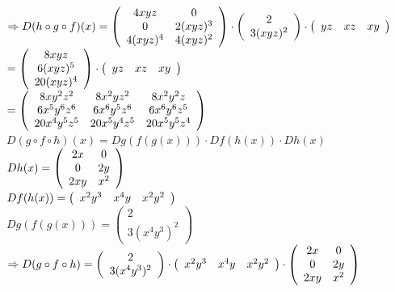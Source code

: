 \documentclass[a4paper]{article}
\begin{document}
$ \Rightarrow D(h \circ g \circ f)(x) = \left(\begin{array}{c c} 4xyz & 0 \\ 0 & 2(xyz)^3 \\ 4(xyz)^4 & 4(xyz)^2 \end{array} \right)
 \cdot \left(\begin{array}{c} 2 \\ 3(xyz)^2 \end{array}\right) \cdot  \left(\begin{array}{c c c} yz & xz & xy \end{array}\right) $\\

$ = \left(\begin{array}{c} 8xyz \\ 6(xyz)^5 \\ 20(xyz)^4 \end{array}\right) \cdot \left(\begin{array}{c c c} yz & xz & xy \end{array}\right) $\\

$ = \left(\begin{array}{c c c} 8xy^2z^2 & 8x^2yz^2 & 8x^2y^2z \\ 6x^5y^6z^6 & 6x^6y^5z^6 & 6 x^6y^6z^5 
\\ 20x^4y^5z^5 & 20 x^5y^4z^5 & 20x^5y^5z^4 \end{array}\right) $\\

$ D(g \circ f \circ h)(x) = Dg(f(g(x))) \cdot Df(h(x)) \cdot Dh(x) $\\

$ Dh(x) =  \left(\begin{array}{c c} 2x & 0 \\ 0 & 2y \\ 2xy & x^2 \end{array} \right) $\\

$ Df(h(x)) =  \left(\begin{array}{c c c} x^2y^3 & x^4y & x^2y^2 \end{array}\right) $\\

$ Dg(f(g(x))) = \left(\begin{array}{c} 2 \\ 3(x^4y^3)^2 \end{array}\right) $\\

$ \Rightarrow D(g \circ f \circ h) = \left(\begin{array}{c} 2 \\ 3(x^4y^3)^2 \end{array}\right) \cdot \left(\begin{array}{c c c} x^2y^3 & x^4y & x^2y^2 \end{array}\right)
\cdot \left(\begin{array}{c c} 2x & 0 \\ 0 & 2y \\ 2xy & x^2 \end{array} \right) $\\
\end{document}
